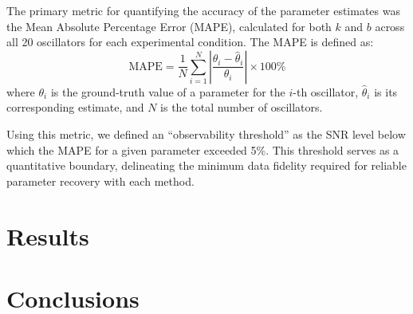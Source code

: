 \documentclass[]{article}
\begin{document}
The primary metric for quantifying the accuracy of the parameter estimates was the Mean Absolute Percentage Error (MAPE), calculated for both $k$ and $b$ across all 20 oscillators for each experimental condition. The MAPE is defined as:
\begin{equation}
\text{MAPE} = \frac{1}{N} \sum_{i=1}^{N} \left| \frac{\theta_i - \hat{\theta}_i}{\theta_i} \right| \times 100\%
\end{equation}
where $\theta_i$ is the ground-truth value of a parameter for the $i$-th oscillator, $\hat{\theta}_i$ is its corresponding estimate, and $N$ is the total number of oscillators.

Using this metric, we defined an ``observability threshold'' as the SNR level below which the MAPE for a given parameter exceeded 5\%. This threshold serves as a quantitative boundary, delineating the minimum data fidelity required for reliable parameter recovery with each method.

\section{Results}
\label{sec:results}


\section{Conclusions}
\label{sec:conclusions}



{}

\end{document}
